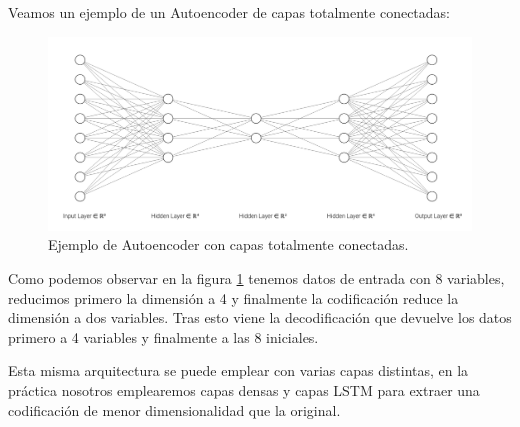 Veamos un ejemplo de un Autoencoder de capas totalmente conectadas:

\begin{figure}[H]
	\centering
	\includegraphics[scale=0.35]{imagenes/autoencoder_ejemplo.png}
	\caption{Ejemplo de Autoencoder con capas totalmente conectadas.}
	\label{img:ejemplo-autoencoder}
\end{figure}

Como podemos observar en la figura \ref{img:ejemplo-autoencoder} tenemos datos de entrada con 8 variables, reducimos primero la dimensión a 4 y finalmente la codificación reduce la dimensión a dos variables. Tras esto viene la decodificación que devuelve los datos primero a 4 variables y finalmente a las 8 iniciales.

Esta misma arquitectura se puede emplear con varias capas distintas, en la práctica nosotros emplearemos capas densas y capas LSTM para extraer una codificación de menor dimensionalidad que la original.